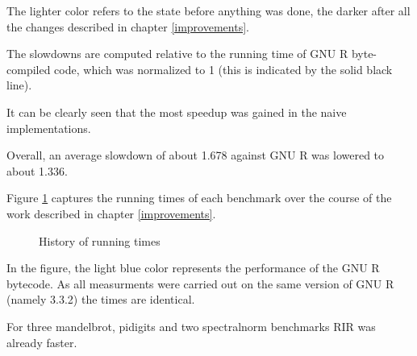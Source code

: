 The lighter color refers to the state before anything was done, the darker after all the changes described in chapter \ref{improvements}.

The slowdowns are computed relative to the running time of GNU R byte-compiled code, which was normalized to 1 (this is indicated by the solid black line).

It can be clearly seen that the most speedup was gained in the naive implementations.

Overall, an average slowdown of about 1.678 against GNU R was lowered to about 1.336.

Figure \ref{fig:history} captures the running times of each benchmark over the course of the work described in chapter \ref{improvements}.

\begin{figure}[htbp]
  \caption{\label{fig:history}History of running times}
  \centering
\end{figure}

In the figure, the light blue color represents the performance of the GNU R bytecode. As all measurments were carried out on the same version of GNU R (namely 3.3.2) the times are identical.

For three mandelbrot, pidigits and two spectralnorm benchmarks RIR was already faster.

